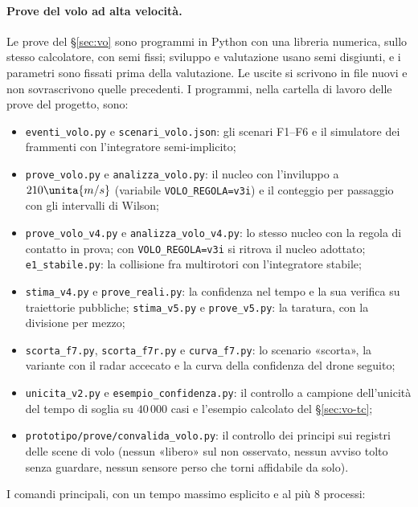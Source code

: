 \sloppy\paragraph{Prove del volo ad alta velocità.} Le prove del \S\ref{sec:vo} sono programmi in Python con una libreria numerica, sullo stesso calcolatore, con semi fissi; sviluppo e valutazione usano semi disgiunti, e i parametri sono fissati prima della valutazione. Le uscite si scrivono in file nuovi e non sovrascrivono quelle precedenti. I programmi, nella cartella di lavoro delle prove del progetto, sono:
\begin{itemize}
\item \texttt{eventi\_volo.py} e \texttt{scenari\_volo.json}: gli scenari F1--F6 e il simulatore dei frammenti con l'integratore semi-implicito;
\item \texttt{prove\_volo.py} e \texttt{analizza\_volo.py}: il nucleo con l'inviluppo a $210\unita{m/s}$ (variabile \texttt{VOLO\_REGOLA=v3i}) e il conteggio per passaggio con gli intervalli di Wilson;
\item \texttt{prove\_volo\_v4.py} e \texttt{analizza\_volo\_v4.py}: lo stesso nucleo con la regola di contatto in prova; con \texttt{VOLO\_REGOLA=v3i} si ritrova il nucleo adottato; \texttt{e1\_stabile.py}: la collisione fra multirotori con l'integratore stabile;
\item \texttt{stima\_v4.py} e \texttt{prove\_reali.py}: la confidenza nel tempo e la sua verifica su traiettorie pubbliche; \texttt{stima\_v5.py} e \texttt{prove\_v5.py}: la taratura, con la divisione per mezzo;
\item \texttt{scorta\_f7.py}, \texttt{scorta\_f7r.py} e \texttt{curva\_f7.py}: lo scenario «scorta», la variante con il radar accecato e la curva della confidenza del drone seguito;
\item \texttt{unicita\_v2.py} e \texttt{esempio\_confidenza.py}: il controllo a campione dell'unicità del tempo di soglia su $40\,000$ casi e l'esempio calcolato del \S\ref{sec:vo-tc};
\item \texttt{prototipo/prove/convalida\_volo.py}: il controllo dei principi sui registri delle scene di volo (nessun «libero» sul non osservato, nessun avviso tolto senza guardare, nessun sensore perso che torni affidabile da solo).
\end{itemize}
I comandi principali, con un tempo massimo esplicito e al più 8 processi:

